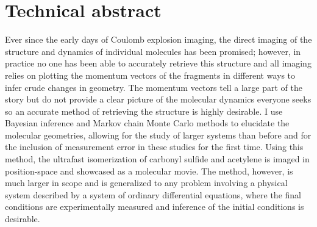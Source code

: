 \begingroup
\let\clearpage\relax
\let\cleardoublepage\relax
\let\cleardoublepage\relax

\chapter*{Technical abstract}
Ever since the early days of Coulomb explosion imaging, the direct imaging of the structure and dynamics of individual molecules has been promised; however, in practice no one has been able to accurately retrieve this structure and all imaging relies on plotting the momentum vectors of the fragments in different ways to infer crude changes in geometry. The momentum vectors tell a large part of the story but do not provide a clear picture of the molecular dynamics everyone seeks so an accurate method of retrieving the structure is highly desirable. I use Bayesian inference and Markov chain Monte Carlo methods to elucidate the molecular geometries, allowing for the study of larger systems than before and for the inclusion of measurement error in these studies for the first time. Using this method, the ultrafast isomerization of carbonyl sulfide and acetylene is imaged in position-space and showcased as a molecular movie. The method, however, is much larger in scope and is generalized to any problem involving a physical system described by a system of ordinary differential equations, where the final conditions are experimentally measured and inference of the initial conditions is desirable.

\vfill

\endgroup			

\vfill
